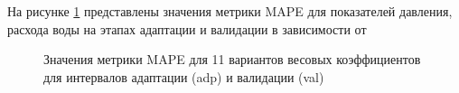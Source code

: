 \documentclass{article}
\begin{document}
На рисунке \ref{fig:wp} представлены значения метрики MAPE для показателей давления, расхода воды на этапах адаптации и валидации в зависимости от 


\begin{figure}
	\caption{Значения метрики MAPE для 11 вариантов весовых коэффициентов для интервалов адаптации (adp) и валидации (val)}
	\label{fig:wp}
\end{figure}
\end{document}

